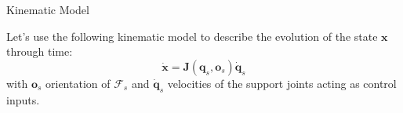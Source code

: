 \documentclass[10pt]{beamer}
\begin{document}
    \begin{frame}{Kinematic Model}
        \justifying

        Let's use the following kinematic model to describe the
        evolution of the state $\bm{x}$ through time:
        \begin{equation*}
            \bm{\dot{x}} = \bm{J}(\bm{q}_s, \bm{o}_s) \bm{\dot{q}}_s
        \end{equation*}
        with $\bm{o}_s$ orientation of $\mathcal{F}_s$ and
        $\bm{\dot{q}}_s$ velocities of the support joints
        acting as control inputs.

\end{frame}
\end{document}
